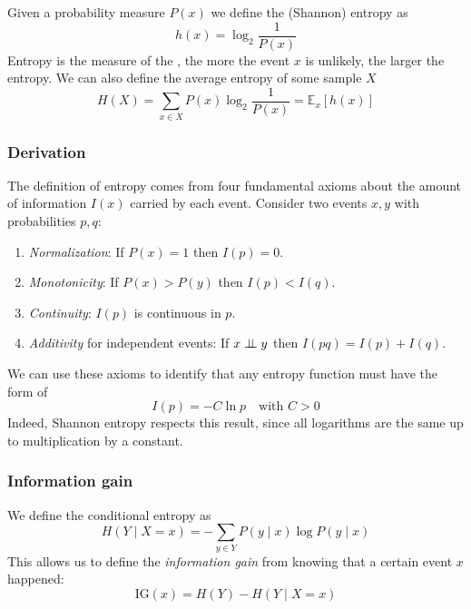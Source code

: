 \documentclass[12pt]{extarticle}
\begin{document}
Given a probability measure $P(x)$ we define the (Shannon) entropy as
\begin{equation}
	h(x) = \log_2 \frac{1}{P(x)}
\end{equation}
Entropy is the measure of the , the more the event $x$ is unlikely, the larger the
entropy.
We can also define the average entropy of some sample $X$
\begin{equation}
	H(X) = \sum_{x \in X} P(x) \log_2 \frac{1}{P(x)} = \mathds{E}_x[h(x)]
\end{equation}

\subsubsection{Derivation}

The definition of entropy comes from four fundamental axioms about the amount of information $I(x)$
carried by each event. Consider two events $x, y$ with probabilities $p, q$:
\begin{enumerate}
	\item \emph{Normalization}: If $P(x) = 1$ then $I(p) = 0$.
	\item \emph{Monotonicity}: If $P(x) > P(y)$ then $I(p) < I(q)$.
	\item \emph{Continuity}: $I(p)$ is continuous in $p$.
	\item \emph{Additivity} for independent events: If $x \perp \!\!\! \perp y$ then $I(pq) = I(p) + I(q)$.
\end{enumerate}

We can use these axioms to identify that any entropy function must have the form of
\begin{equation}
	I(p) = -C \ln p \quad \text {with } C > 0
\end{equation}
Indeed, Shannon entropy respects this result, since all logarithms are the same up to multiplication
by a constant.

\subsubsection{Information gain}

We define the conditional entropy as
\begin{equation}
	H(Y \mid X = x) = - \sum_{y \in Y} P(y \mid x) \log P(y \mid x)
\end{equation}
This allows us to define the \emph{information gain} from knowing that a certain event $x$ happened:
\begin{equation}
	\mathrm{IG}(x) = H(Y) - H(Y \mid X = x)
\end{equation}
\end{document}
